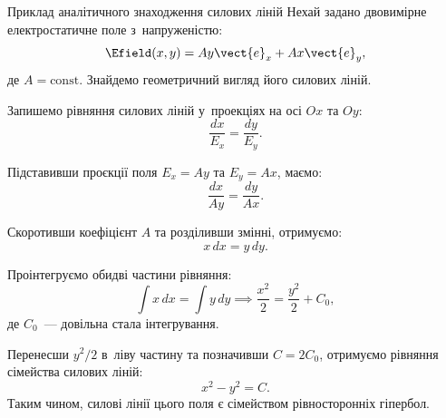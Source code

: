 \begin{Example}{Приклад аналітичного знаходження силових ліній}
	Нехай задано двовимірне електростатичне поле з~напруженістю:
	\begin{equation}
		\Efield(x, y) = A y \vect{e}_x + A x \vect{e}_y,\label{eq:HyperbolicField}
	\end{equation}
	де $A = \text{const}$. Знайдемо геометричний вигляд його силових ліній.

	Запишемо рівняння силових ліній у~проекціях на осі $Ox$ та $Oy$:
	\begin{equation}
		\frac{dx}{E_x} = \frac{dy}{E_y}.
	\end{equation}

	Підставивши проєкції поля $E_x = A y$ та $E_y = A x$, маємо:
	\begin{equation}
		\frac{dx}{A y} = \frac{dy}{A x}.
	\end{equation}

	Скоротивши коефіцієнт $A$ та розділивши змінні, отримуємо:
	\begin{equation}
		x \, dx = y \, dy.
	\end{equation}

	Проінтегруємо обидві частини рівняння:
	\begin{equation}
		\int x \, dx = \int y \, dy \implies \frac{x^2}{2} = \frac{y^2}{2} + C_0,
	\end{equation}
	де $C_0$~--- довільна стала інтегрування.

	Перенесши $y^2/2$ в~ліву частину та позначивши $C = 2 C_0$, отримуємо рівняння сімейства
	силових ліній:
	\begin{equation}
		x^2 - y^2 = C.\label{eq:HyperbolicLines}
	\end{equation}
	Таким чином, силові лінії цього поля є сімейством рівносторонніх гіпербол.
\end{Example}

